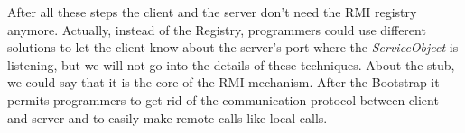 After all these steps the client and the server don't need the RMI registry anymore. Actually, instead of the Registry, programmers could use different solutions to let the client know about the server's port where the \textit{ServiceObject} is listening, but we will not go into the details of these techniques. 
About the stub, we could say that it is the core of the RMI mechanism. After the Bootstrap it permits programmers to get rid of the communication protocol between client and server and to easily make remote calls like local calls.
